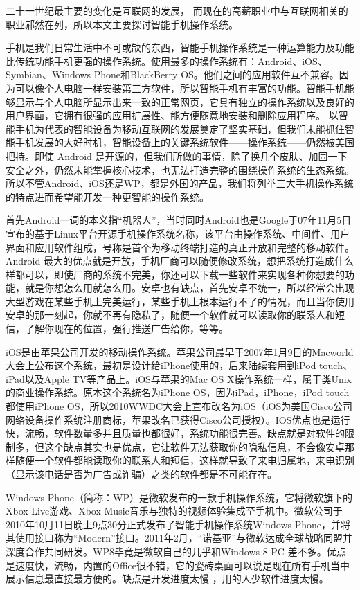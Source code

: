 \documentclass[cs4size,a4paper,nofonts]{ctexart}
\begin{document}
二十一世纪最主要的变化是互联网的发展， 而现在的高薪职业中与互联网相关的职业郝然在列，所以本文主要探讨智能手机操作系统。

手机是我们日常生活中不可或缺的东西，智能手机操作系统是一种运算能力及功能比传统功能手机更强的操作系统。使用最多的操作系统有：Android、iOS、Symbian、Windows Phone和BlackBerry OS。他们之间的应用软件互不兼容。因为可以像个人电脑一样安装第三方软件，所以智能手机有丰富的功能。智能手机能够显示与个人电脑所显示出来一致的正常网页，它具有独立的操作系统以及良好的用户界面，它拥有很强的应用扩展性、能方便随意地安装和删除应用程序。 以智能手机为代表的智能设备为移动互联网的发展奠定了坚实基础，但我们未能抓住智能手机发展的大好时机，智能设备上的关键系统软件——操作系统——仍然被美国把持。即使 Android 是开源的，但我们所做的事情，除了换几个皮肤、加固一下安全之外，仍然未能掌握核心技术，也无法打造完整的围绕操作系统的生态系统。所以不管Android、iOS还是WP，都是外国的产品，我们将列举三大手机操作系统的特点进而希望能开发一种更智能的操作系统。

首先Android一词的本义指“机器人”，当时同时Android也是Google于07年11月5日宣布的基于Linux平台开源手机操作系统名称，该平台由操作系统、中间件、用户界面和应用软件组成，号称是首个为移动终端打造的真正开放和完整的移动软件。 Android 最大的优点就是开放，手机厂商可以随便修改系统，想把系统打造成什么样都可以，即使厂商的系统不完美，你还可以下载一些软件来实现各种你想要的功能，就是你想怎么用就怎么用。安卓也有缺点，首先安卓不统一，所以经常会出现大型游戏在某些手机上完美运行，某些手机上根本运行不了的情况，而且当你使用安卓的那一刻起，你就不再有隐私了，随便一个软件就可以读取你的联系人和短信，了解你现在的位置，强行推送广告给你，等等。

iOS是由苹果公司开发的移动操作系统。苹果公司最早于2007年1月9日的Macworld大会上公布这个系统，最初是设计给iPhone使用的，后来陆续套用到iPod touch、iPad以及Apple TV等产品上。iOS与苹果的Mac OS X操作系统一样，属于类Unix的商业操作系统。原本这个系统名为iPhone OS，因为iPad，iPhone，iPod touch都使用iPhone OS，所以2010WWDC大会上宣布改名为iOS（iOS为美国Cisco公司网络设备操作系统注册商标，苹果改名已获得Cisco公司授权）。IOS优点也是运行快，流畅，软件数量多并且质量也都很好，系统功能很完善。缺点就是对软件的限制多，但这个缺点其实也是优点，它让软件无法获取你的隐私信息，不会像安卓那样随便一个软件都能读取你的联系人和短信，这样就导致了来电归属地，来电识别（显示该电话是否为广告或诈骗）之类的软件都是不可能存在。

Windows Phone（简称：WP）是微软发布的一款手机操作系统，它将微软旗下的Xbox Live游戏、Xbox Music音乐与独特的视频体验集成至手机中。微软公司于2010年10月11日晚上9点30分正式发布了智能手机操作系统Windows Phone，并将其使用接口称为“Modern”接口。2011年2月，“诺基亚”与微软达成全球战略同盟并深度合作共同研发。WP8毕竟是微软自己的几乎和Windows 8 PC 差不多。优点是速度快，流畅，内置的Office很不错，它的瓷砖桌面可以说是现在所有手机当中展示信息最直接最方便的。缺点是开发进度太慢 ，用的人少软件进度太慢。
\end{document}
